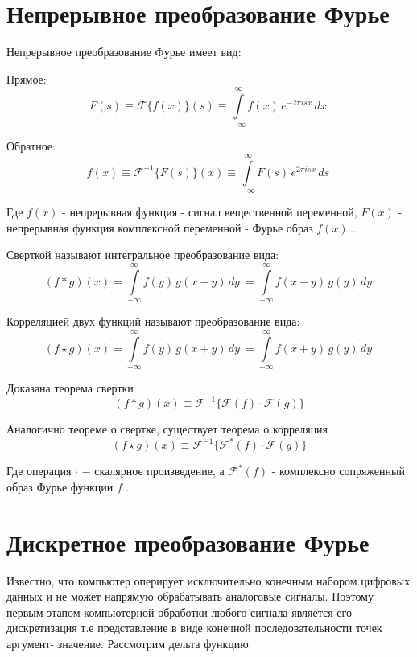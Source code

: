 \documentclass[oneside,final,14pt]{extreport}
\begin{document}
\section{Непрерывное преобразование Фурье}


Непрерывное преобразование Фурье имеет вид: 

Прямое:
\begin{equation}
F(s) 
\equiv
\mathcal{F}\{f(x)\}(s)
\equiv
{\int\limits_{-\infty}^{\infty}f(x)\,e^{-2\pi i s x}\,dx~}
\end{equation}

Обратное: 
\begin{equation}
f(x) 
\equiv
\mathcal{F}^{-1}\{F(s)\}(x)
\equiv
{\int\limits_{-\infty}^{\infty}F(s)\,e^{2\pi i s x}\,ds~}
\end{equation}

Где $f(x)$ - непрерывная функция - сигнал вещественной переменной,
$F(x)$ - непрерывная функция комплексной переменной - Фурье образ $f(x)$ \cite{Gonzalez}. 

Сверткой называют интегральное преобразование вида:
\begin{equation}
(f*g)(x)
=
{\int\limits_{-\infty}^{\infty} f(y)\,g(x-y)\,dy~} 
=
{\int\limits_{-\infty}^{\infty} f(x-y)\,g(y)\,dy~}  
\end{equation}

Корреляцией двух функций называют преобразование вида:
\begin{equation}
(f \star g)(x) 
= 
{\int\limits_{-\infty}^{\infty} f(y)\,g(x+y)\,dy~} 
= 
{\int\limits_{-\infty}^{\infty} f(x+y)\,g(y)\,dy~}  
\end{equation}

Доказана теорема свертки 
\begin{equation}
{(f*g)(x)}
\equiv
\mathcal{F}^{-1} \{
\mathcal{F}(f) \cdot \mathcal{F}(g) 
\}
\label{correlation_theorem}
\end{equation}

Аналогично теореме о свертке, существует теорема о корреляция 
\begin{equation}
{(f \star g)(x)} 
\equiv
\mathcal{F}^{-1} \{
\mathcal{F}^*(f) \cdot \mathcal{F}(g) 
\}
\end{equation}

Где операция \hspace{3pt} $\cdot$ \hspace{3pt} $-$ скалярное произведение, а $\mathcal{F}^*(f)$ - комплексно сопряженный образ Фурье функции $f$ .

\section{Дискретное преобразование Фурье}
Известно, что компьютер оперирует исключительно конечным набором цифровых данных и не может напрямую обрабатывать аналоговые сигналы. Поэтому первым этапом компьютерной обработки любого сигнала является его дискретизация т.е представление в виде конечной последовательности точек аргумент- значение.
Рассмотрим дельта функцию 
\end{document}
